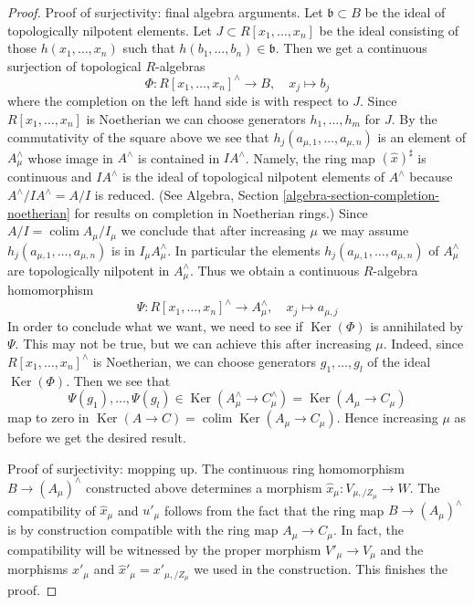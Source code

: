 \documentclass[10pt,a4paper]{amsart}
\theoremstyle{plain}
\theoremstyle{definition}
\theoremstyle{remark}
\numberwithin{equation}{subsection}
\def\colim{\mathop{\mathrm{colim}}\nolimits}
\def\Ker{\mathop{\mathrm{Ker}}}
\begin{document}
\begin{proof}
\medskip\noindent
Proof of surjectivity: final algebra arguments.
Let $\mathfrak b \subset B$ be the ideal of topologically nilpotent
elements. Let $J \subset R[x_1, \ldots, x_n]$ be the ideal
consisting of those $h(x_1, \ldots, x_n)$ such that
$h(b_1, \ldots, b_n) \in \mathfrak b$. Then we get a continuous
surjection of topological $R$-algebras
$$
\Phi : R[x_1, \ldots, x_n]^\wedge \longrightarrow B,\quad
x_j \longmapsto b_j
$$
where the completion on the left hand side is with respect to $J$.
Since $R[x_1, \ldots, x_n]$ is Noetherian we can choose
generators $h_1, \ldots, h_m$ for $J$. By the commutativity
of the square above we see that $h_j(a_{\mu, 1}, \ldots, a_{\mu, n})$ is
an element of $A_\mu^\wedge$ whose image in $A^\wedge$ is contained
in $IA^\wedge$. Namely, the ring map $(\hat x)^\sharp$ is continuous
and $IA^\wedge$ is the ideal of topological nilpotent elements
of $A^\wedge$ because $A^\wedge/IA^\wedge = A/I$ is reduced.
(See Algebra, Section \ref{algebra-section-completion-noetherian}
for results on completion in Noetherian rings.)
Since $A/I = \colim A_\mu/I_\mu$ we conclude that after increasing
$\mu$ we may assume $h_j(a_{\mu, 1}, \ldots, a_{\mu, n})$ is in
$I_\mu A_\mu^\wedge$. In particular the elements
$h_j(a_{\mu, 1}, \ldots, a_{\mu, n})$ of $A_\mu^\wedge$
are topologically nilpotent in $A_\mu^\wedge$.
Thus we obtain a continuous $R$-algebra homomorphism
$$
\Psi : R[x_1, \ldots, x_n]^\wedge \longrightarrow A_\mu^\wedge,\quad
x_j \longmapsto a_{\mu, j}
$$
In order to conclude what we want, we need to see if $\Ker(\Phi)$ is
annihilated by $\Psi$. This may not be true, but we can achieve
this after increasing $\mu$. Indeed, since
$R[x_1, \ldots, x_n]^\wedge$ is Noetherian,
we can choose generators $g_1, \ldots, g_l$ of the ideal
$\Ker(\Phi)$. Then we see that
$$
\Psi(g_1), \ldots, \Psi(g_l) \in
\Ker(A_\mu^\wedge \to C_\mu^\wedge) = \Ker(A_\mu \to C_\mu)
$$
map to zero in $\Ker(A \to C) = \colim \Ker(A_\mu \to C_\mu)$.
Hence increasing $\mu$ as before we get the desired result.

\medskip\noindent
Proof of surjectivity: mopping up. The continuous ring homomorphism
$B \to (A_\mu)^\wedge$ constructed above determines a morphism
$\hat x_\mu : V_{\mu, /Z_\mu} \to W$.
The compatibility of $\hat x_\mu$ and $u'_\mu$ follows
from the fact that the ring map $B \to (A_\mu)^\wedge$
is by construction compatible with the ring map $A_\mu \to C_\mu$.
In fact, the compatibility will be witnessed by the proper morphism
$V'_\mu \to V_\mu$ and the morphisms
$x'_\mu$ and $\hat x'_\mu = x'_{\mu, /Z_\mu}$ we used in
the construction. This finishes the proof.
\end{proof}
\end{document}
